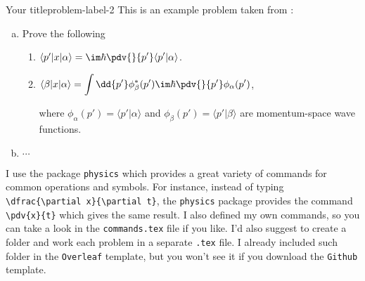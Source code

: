 	\begin{problem}{Your title}{problem-label-2}
		This is an example problem taken from \cite{Sakurai2020}:
		
		\begin{enumerate}[(a)]
			\item Prove the following
			\begin{enumerate}[label = (\roman*)]
				\item $\langle p' | x | \alpha \rangle = \im \hbar \displaystyle{\pdv{}{p'} }\langle p' | \alpha \rangle$.
				
				\item $\langle \beta | x | \alpha \rangle = \displaystyle{\int \dd{p'} \phi_{\beta}^{*} (p') \im \hbar \pdv{}{p'} \phi_{\alpha} (p')}$, 
				
				\vspace{1ex}
				
				where $\phi_{\alpha}(p') = \langle p' | \alpha \rangle$ and $\phi_{\beta}(p') = \langle p' | \beta \rangle$ are momentum-space wave functions.
			\end{enumerate}
			
			\item $\cdots$
		\end{enumerate}
	\end{problem}
	
	I use the package \texttt{physics} which provides a great variety of commands for common operations and symbols. For instance, instead of typing \verb|\dfrac{\partial x}{\partial t}|, the \texttt{physics} package provides the command \verb|\pdv{x}{t}| which gives the same result. I also defined my own commands, so you can take a look in the \texttt{commands.tex} file if you like. I'd also suggest to create a folder and work each problem in a separate \texttt{.tex} file. I already included such folder in the \texttt{Overleaf} template, but you won't see it if you download the \texttt{Github} template. 
	
	
	
	
	
	
	
